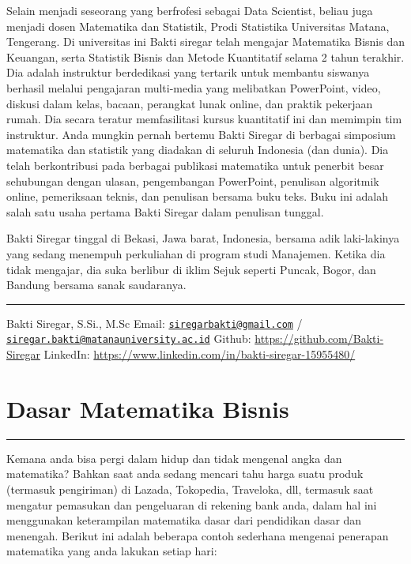 \documentclass[
]{book}
\begin{document}
Selain menjadi seseorang yang berfrofesi sebagai Data Scientist, beliau juga menjadi dosen Matematika dan Statistik, Prodi Statistika Universitas Matana, Tengerang. Di universitas ini Bakti siregar telah mengajar Matematika Bisnis dan Keuangan, serta Statistik Bisnis dan Metode Kuantitatif selama 2 tahun terakhir. Dia adalah instruktur berdedikasi yang tertarik untuk membantu siswanya berhasil melalui pengajaran multi-media yang melibatkan PowerPoint, video, diskusi dalam kelas, bacaan, perangkat lunak online, dan praktik pekerjaan rumah. Dia secara teratur memfasilitasi kursus kuantitatif ini dan memimpin tim instruktur. Anda mungkin pernah bertemu Bakti Siregar di berbagai simposium matematika dan statistik yang diadakan di seluruh Indonesia (dan dunia). Dia telah berkontribusi pada berbagai publikasi matematika untuk penerbit besar sehubungan dengan ulasan, pengembangan PowerPoint, penulisan algoritmik online, pemeriksaan teknis, dan penulisan bersama buku teks. Buku ini adalah salah satu usaha pertama Bakti Siregar dalam penulisan tunggal.

Bakti Siregar tinggal di Bekasi, Jawa barat, Indonesia, bersama adik laki-lakinya yang sedang menempuh perkuliahan di program studi Manajemen. Ketika dia tidak mengajar, dia suka berlibur di iklim Sejuk seperti Puncak, Bogor, dan Bandung bersama sanak saudaranya.

\begin{center}\rule{0.5\linewidth}{0.5pt}\end{center}

Bakti Siregar, S.Si., M.Sc
Email: \href{mailto:siregarbakti@gmail.com}{\nolinkurl{siregarbakti@gmail.com}} / \href{mailto:siregar.bakti@matanauniversity.ac.id}{\nolinkurl{siregar.bakti@matanauniversity.ac.id}}
Github: \url{https://github.com/Bakti-Siregar}
LinkedIn: \url{https://www.linkedin.com/in/bakti-siregar-15955480/}

\hypertarget{Dasar-Matematika-Bisnis}{%
\chapter{Dasar Matematika Bisnis}\label{Dasar-Matematika-Bisnis}}

\begin{center}\rule{0.5\linewidth}{0.5pt}\end{center}

Kemana anda bisa pergi dalam hidup dan tidak mengenal angka dan matematika? Bahkan saat anda sedang mencari tahu harga suatu produk (termasuk pengiriman) di Lazada, Tokopedia, Traveloka, dll, termasuk saat mengatur pemasukan dan pengeluaran di rekening bank anda, dalam hal ini menggunakan keterampilan matematika dasar dari pendidikan dasar dan menengah. Berikut ini adalah beberapa contoh sederhana mengenai penerapan matematika yang anda lakukan setiap hari:
\end{document}
